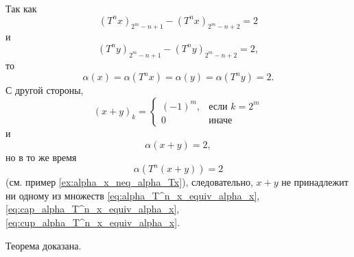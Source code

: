 Так как
\begin{equation}
	(T^n x)_{2^m-n+1} - (T^n x)_{2^m-n+2} = 2
\end{equation}
и
\begin{equation}
	(T^n y)_{2^m-n+1} - (T^n y)_{2^m-n+2} = 2
	,
\end{equation}
то
\begin{equation}
	\alpha(x) = \alpha(T^n x) = \alpha(y) = \alpha(T^n y) = 2
	.
\end{equation}
С другой стороны,
\begin{equation}
	(x+y)_k = \begin{cases}
		(-1)^m,  & \mbox{если } k = 2^m     \\
		0        & \mbox{иначе }
	\end{cases}
\end{equation}
и
\begin{equation}
	\alpha(x+y) = 2
	,
\end{equation}
но в то же время
\begin{equation}
	\alpha(T^n(x+y)) = 2
\end{equation}
(см. пример \ref{ex:alpha_x_neq_alpha_Tx}),
следовательно, $x+y$ не принадлежит ни одному из множеств
\eqref{eq:alpha_T^n_x_equiv_alpha_x}, \eqref{eq:cap_alpha_T^n_x_equiv_alpha_x}, \eqref{eq:cup_alpha_T^n_x_equiv_alpha_x}.

Теорема доказана.



